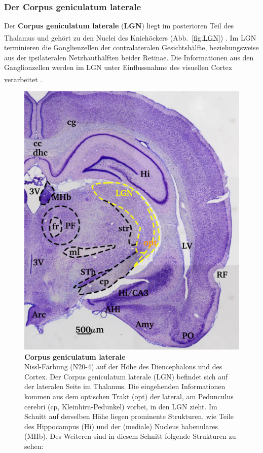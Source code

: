 \documentclass[12pt,a4paper,pdftex]{article}
\begin{document}
\newpage
\subsubsection*{Der Corpus geniculatum laterale}

Der \textbf{Corpus geniculatum laterale} (\textbf{LGN})  liegt im posterioren Teil des Thalamus und gehört zu den Nuclei des Kniehöckers (Abb.~\ref{fig:LGN}) \textsuperscript{\cite[12]{crossman2014neuroanatomy}}. Im LGN terminieren die Ganglienzellen der contralateralen Gesichtshälfte, beziehungsweise aus der ipsilateralen Netzhauthälften beider Retinae. Die Informationen aus den Ganglionzellen werden im LGN unter Einflussnahme des visuellen Cortex verarbeitet
\textsuperscript{\cite[8.1]{trepel2011neuroanatomie}}.

\begin{figure}[H]
    \centering
    \includegraphics{pictures/visual/LGN.png}
    \caption[Corpus geniculatum laterale]{\textbf{Corpus geniculatum laterale}\\
    Nissl-Färbung (N20-4) auf der Höhe des Diencephalons und des Cortex. Der Corpus geniculatum laterale (LGN) befindet sich auf der lateralen Seite im Thalamus. Die eingehenden Informationen kommen aus dem optischen Trakt (opt) der lateral, am Pedunculus cerebri (cp, Kleinhirn-Pedunkel) vorbei, in den LGN zieht. Im Schnitt auf derselben Höhe liegen prominente Strukturen, wie Teile des Hippocampus (Hi) und der (mediale) Nucleus habenulares (MHb). Des Weiteren sind in diesem Schnitt folgende Strukturen zu sehen: 
}
\end{figure}
\end{document}
